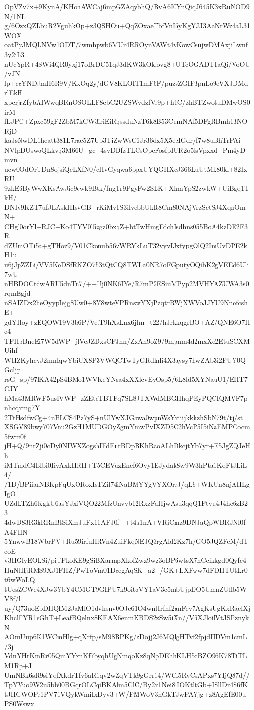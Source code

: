 OpVZv7x+9KynA/KHonAWCaj6mpGZAqybhQ/BvA6I0YnQiqJ645K3xRuNOD9N/1NL
g/6OzxQZLbuR2VguhkOp+z3QSHOu+QqZOxaeTbfVnI5yKgYJJ3AaNrWz4aL31WOX
oatPyJMQLNVw1ODT/7wmhpwb6MUr4RROynVAWt4vKowCsujwDMAxjiLwnf3y2iL3
nUcYpR+4SWi4QR0yxj17oBrDC51qJ3dKW3kOkiovg8+UTcOGADT1aQi/VoOU/vJN
lp+ccYNDJmH6R9V/KxOq2y/dGV8KLOIT1mF6F/puzsZGIF3pnLo9eVXJDMdrlEkH
xpcrjrZfybAIWwqBRnOSOLLF8ebC2UZSWvdzfVr9p+h1C/zhBTZwotuDMwOS0irM
fLJPC+Zpxc59gF2ZbM7kCW3iriEiRqssduNzT6k8B53CumNAf5DFgRBmh13NORjD
kaJsNwDL1heatt381L7rae5Z7Ub3TiZwWsC6Jr36dx5X5ecIGdr/f7w8uBhTrPAi
NVlpDUswoQLkvq3M66U+gc+4svDDfzTLCsOpeFosfpIUR2o5lsVpxxd+Pm4yDmvn
ucw0OdOrTDn8ojsiQeLXfN0/cHvGyqwa6ppxUYQGHXcJ366LuUtMk80kl+82IxRU
9zkE6ByWwXKsAwJic9ewk9Btk/fngTr9PgyFw2SLK+XhmYpS2zwkW+UiBgq1TkH/
DNIv9KZT7ufJLAskHIsvGB+rKiMv1S3ilvebbUkR8Cm80NAjVrzSctSJ4XqnOmN+
CHgl0orYl+RJC+Ko4TYV0l5zgz0bxqZ+btTwHmgFdchIsdhns055BoA4kzDE2F3R
dZUmOTi5a+gTHoz9/V01Ckonub56vWRYkLuT32yyvIJxfypgOlQ2ImUvDPE2kH1u
u6jJpZZLi/VV5KoDSfRKZO753tQtCQ8TWLa0NR7oFGputyOQibK2gVEEd6Uli7wU
nHBDOCtdwARU5dnTn7/++Uj0NK6IYe/R7mP2ESiuMPyp2MVHYAZUWA3s0rqmEgjd
nSAIZDx2beOyypIejg8Uw0+8Y8wteVPRnswYXjPzqtrRWjXWVoJJYU9NnofcshE+
gdYHoy+zEQOW19V3b6P/VeiT9hXsLnx6jIm+t22/hJrkkqgrBO+AZ/QNE6O7IIc4
TFHpBneEi7W5dWP+jlVeJZDxsCFJhn/ZxAh9oZ9/9mpnm4d2mxXe2EtuSCXMUihf
WHZKyhcvJ2mnIqwYbiUX8P3VWQCTwTyGRdlnli4X3aysy7hwZAb3i2FUY0QGcljp
rsG+sp/97lKA42pS4BMo1WVKeYNsa4xXXlcvEyOsp5/6L8ld5XYNauU1/EHT7CJY
hMa43MRWF5usIVWF+zZEteTBTFq7SL8JTXWdMBGHhqPEyPQCIQMVF7pnhcqxmg7Y
2TtHsdfwCg+4nBLCS4Pz7yS+nUlYwXJGawa0wpnWsYxiiijkkhzhSbN79t/tj/st
XSGV89bwy707Vnu2GzH1MUDGOyZgmYmwPvIXZD5C2hVcP5I5iNaEMPCocm5fwm0f
jH+Q/9nrZji0cDy0NIWXZogshIFdEurBDpBKhRaoALhDkcjtYb7yr+E5JgZQJeHh
iMTmdC4Blbi0IivAxkHRH+T5CEVuzEnef6Ovy1EJydak8w9W3hPta1KqFtJLiL4/
/1D/BPiiarNBKpFqUxORoxIsTZil74iNaBMYYgVYXOrrJ/qL9+WKUn8njAHLgIgO
UZdLTZh6KgkU6asYJxiVQO22MfzUnvvb12RxzFdHjwAsu3qqQ1Ftvu4J4hc6zB23
4dwD83R3hRRnBtSiXmJuFx11AFJ0f++t4a1nA+VRiCmz9DNJaQpWBRJNl0fA4FHN
5YnwwB18WbrPV+Ru59irfuHRVn4ZuiFkqNEJQ3rgAld2Kz7h/GO5JQZFcM/dTcoE
v3HGlyEOLSi/piTPkoKE9gSiBXarmpXkofZwz9wg3oBP6wtsX7hCcikkgd0Qyfc4
HuNHIjRMS9XJ1FHZ/PwToVm01DeegAqSK+a2+/GK+LXFww7dFDHTUtLr0t6wWoLQ
tUesZCWe4XJw3YbY4CMGT9GIPU7k9oitoVY1aV3c5mbUjpDO5UmnZUflb5WV8f/l
uy/Q73uoEbDHQIM2JaMlO1dvhsnv0OJc61O4wnHrfhf2anFev7AgKsUgKxRaclXj
KhclFYR1eGhT+LeafBQelnx8KEAX6enmKBDS2zSw5iXn//V6XJloilVtJSPznykN
AOmUup6K1WCmHlg+qXrfp/sM98BPKg/zDojj2J6MQlgHTvf2fpjdIIDVm1cmL/3j
VdnYHrKmRr05QmYYxnKf7byqhUgNmqoKz8qNpDEhhKLH5cBZO96K78TiTLM1Rp+J
UmNBk6sR9siYqfXkdrTfv6aR1qv2wZqVTk9gGrr14/WCl5RvCsAPxs7YIjQ87d//
TpYVuo9W2u5bb00BGqrOLCqiBKAlm5ClC/By2x1Nei8iIOKtltGb+ISllDr4S6fK
tJHGWOPr1PV71VQykWmiIxDyv3+W/FMWoV3hGkTJwPAYjg+z8AgEfE00uPS0Wswx

